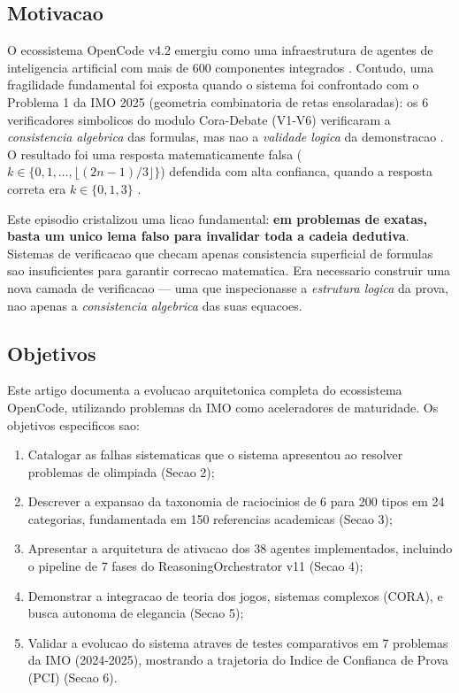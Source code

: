 \documentclass[5p]{elsarticle}
\begin{document}
\subsection{Motivacao}

O ecossistema OpenCode v4.2 emergiu como uma infraestrutura de agentes de
inteligencia artificial com mais de 600 componentes integrados \cite{opencode2026}.
Contudo, uma fragilidade fundamental foi exposta quando o sistema foi confrontado
com o Problema 1 da IMO 2025 (geometria combinatoria de retas ensolaradas):
os 6 verificadores simbolicos do modulo Cora-Debate (V1-V6) verificaram a
\textit{consistencia algebrica} das formulas, mas nao a \textit{validade logica}
da demonstracao \cite{cora2026}. O resultado foi uma resposta matematicamente
falsa ($k \in \{0,1,\dots,\lfloor(2n-1)/3\rfloor\}$) defendida com alta confianca,
quando a resposta correta era $k \in \{0,1,3\}$ \cite{chen2025,deepmind2025}.

Este episodio cristalizou uma licao fundamental: \textbf{em problemas de exatas,
basta um unico lema falso para invalidar toda a cadeia dedutiva}. Sistemas de
verificacao que checam apenas consistencia superficial de formulas sao
insuficientes para garantir correcao matematica. Era necessario construir uma
nova camada de verificacao — uma que inspecionasse a \textit{estrutura logica}
da prova, nao apenas a \textit{consistencia algebrica} das suas equacoes.

\subsection{Objetivos}

Este artigo documenta a evolucao arquitetonica completa do ecossistema OpenCode,
utilizando problemas da IMO como aceleradores de maturidade. Os objetivos
especificos sao:

\begin{enumerate}[label=(\roman*)]
  \item Catalogar as falhas sistematicas que o sistema apresentou ao resolver
    problemas de olimpiada (Secao 2);
  \item Descrever a expansao da taxonomia de raciocinios de 6 para 200 tipos
    em 24 categorias, fundamentada em 150 referencias academicas (Secao 3);
  \item Apresentar a arquitetura de ativacao dos 38 agentes implementados,
    incluindo o pipeline de 7 fases do ReasoningOrchestrator v11 (Secao 4);
  \item Demonstrar a integracao de teoria dos jogos, sistemas complexos (CORA),
    e busca autonoma de elegancia (Secao 5);
  \item Validar a evolucao do sistema atraves de testes comparativos em 7
    problemas da IMO (2024-2025), mostrando a trajetoria do Indice de Confianca
    de Prova (PCI) (Secao 6).
\end{enumerate}
\end{document}
